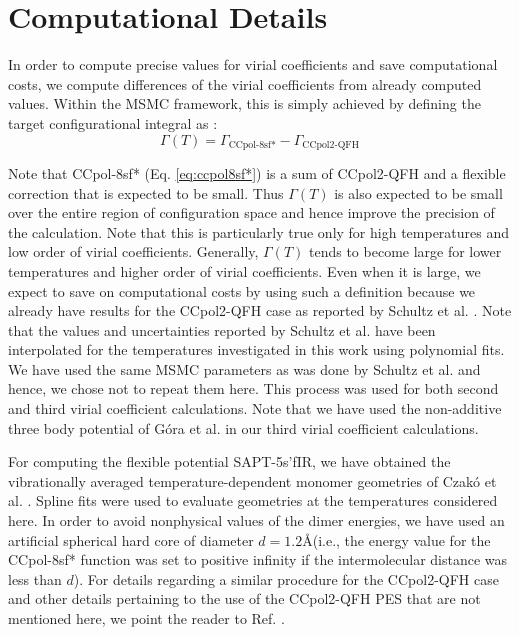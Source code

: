 \section{Computational Details}
    \label{sec:computational details}
        In order to compute precise values for virial coefficients and save computational costs, we compute differences of the virial coefficients from already computed values. Within the MSMC framework, this is simply achieved by defining the target configurational integral as \cite{Shaul2012}:
        \begin{equation}
            \Gamma (T) = \Gamma_{\text{CCpol-8sf*}} - \Gamma_{\text{CCpol2-QFH}}
        \end{equation}

        Note that CCpol-8sf* (Eq. \eqref{eq:ccpol8sf*}) is a sum of CCpol2-QFH and a flexible correction that is expected to be small. Thus $\Gamma (T)$ is also expected to be small over the entire region of configuration space and hence improve the precision of the calculation. Note that this is particularly true only for high temperatures and low order of virial coefficients. Generally, $\Gamma (T)$ tends to become large for lower temperatures and higher order of virial coefficients. Even when it is large, we expect to save on computational costs by using such a definition because we already have results for the CCpol2-QFH case as reported by Schultz et al. \cite{Schultz2015}. Note that the values and uncertainties reported by Schultz et al. have been interpolated for the temperatures investigated in this work using polynomial fits. We have used the same MSMC parameters as was done by Schultz et al. and hence, we chose not to repeat them here. This process was used for both second and third virial coefficient calculations. Note that we have used the non-additive three body potential of G\'{o}ra et al. \cite{Gora2014} in our third virial coefficient calculations.

        For computing the flexible potential SAPT-5s'fIR, we have obtained the vibrationally averaged temperature-dependent monomer geometries of Czak\'{o} et al. \cite{Czako2009}. Spline fits were used to evaluate geometries at the temperatures considered here. In order to avoid nonphysical values of the dimer energies, we have used an artificial spherical hard core of diameter $d = 1.2$\AA (i.e., the energy value for the CCpol-8sf* function was set to positive infinity if the intermolecular distance was less than $d$). For details regarding a similar procedure for the CCpol2-QFH case and other details pertaining to the use of the CCpol2-QFH PES that are not mentioned here, we point the reader to Ref. \cite{Schultz2015}.

